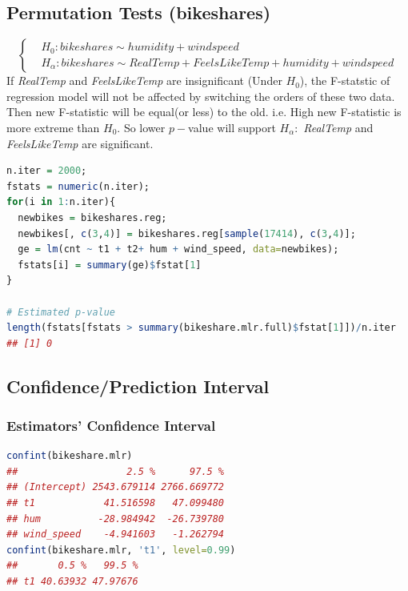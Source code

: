 \documentclass[11pt,a4paper]{article}
\begin{document}
\subsection{Permutation Tests (bikeshares)}
\[\begin{cases}
    &H_0: bikeshares \sim humidity + windspeed\\
    &H_{\alpha}: bikeshares \sim RealTemp + FeelsLikeTemp + humidity + windspeed
    \end{cases}\]
If \textit{RealTemp} and \textit{FeelsLikeTemp} are insignificant (Under $H_0$), the F-statstic of regression model will not be affected by switching the orders of these two data. Then new F-statistic will be equal(or less) to the old. i.e. High new F-statistic is more extreme than $H_0$. So lower $p-$value will support $H_\alpha:$ \textit{RealTemp} and \textit{FeelsLikeTemp} are significant.
\begin{lstlisting}[language=R]
n.iter = 2000;
fstats = numeric(n.iter);
for(i in 1:n.iter){
  newbikes = bikeshares.reg;
  newbikes[, c(3,4)] = bikeshares.reg[sample(17414), c(3,4)];
  ge = lm(cnt ~ t1 + t2+ hum + wind_speed, data=newbikes);
  fstats[i] = summary(ge)$fstat[1]
}

# Estimated p-value
length(fstats[fstats > summary(bikeshare.mlr.full)$fstat[1]])/n.iter
## [1] 0
\end{lstlisting}

\subsection{Confidence/Prediction Interval}
\subsubsection{Estimators' Confidence Interval}
\begin{lstlisting}[language=R]
confint(bikeshare.mlr)
##                   2.5 %      97.5 %
## (Intercept) 2543.679114 2766.669772
## t1            41.516598   47.099480
## hum          -28.984942  -26.739780
## wind_speed    -4.941603   -1.262794
confint(bikeshare.mlr, 't1', level=0.99)
##       0.5 %   99.5 %
## t1 40.63932 47.97676
\end{lstlisting}
\end{document}
